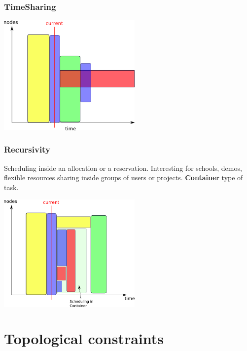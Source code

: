 \documentclass{beamer}
\begin{document}
\begin{frame}
  \frametitle{TimeSharing} 
  \begin{center}
			\includegraphics[width=7cm]{timesharing.png}
	\end{center}
\end{frame}

\begin{frame}
  \frametitle{Recursivity}
  Scheduling inside an allocation or a reservation. Interesting for schools, demos, flexible resources sharing inside groups of users or projects.  {\bf Container} type of task. 
  \begin{center}
			\includegraphics[width=7cm]{recursivity.png}
	\end{center}

\end{frame}

\section{Topological constraints}

\end{document}

